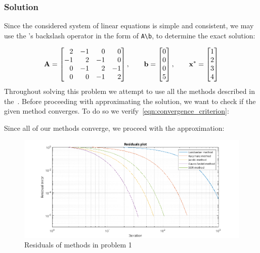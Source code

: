 \subsubsection*{Solution}
Since the considered system of linear equations is simple and consistent, we may use the
\MATLAB's backslash operator in the form of \lstinline[style=Matlab-editor]{A\b}, to
determine the exact solution:

\begin{equation*}
  \mathbf{A} = \begin{bmatrix}
    \phantom{-}2 & -1 & \phantom{-}0 & \phantom{-}0 \\
    -1 & \phantom{-}2 & -1 & \phantom{-}0 \\
    \phantom{-}0 & -1 & \phantom{-}2 & -1 \\
    \phantom{-}0 & \phantom{-}0 & -1 & \phantom{-}2
  \end{bmatrix}, \qquad
  \mathbf{b} = \begin{bmatrix}
    0 \\
    0 \\
    0 \\
    5
  \end{bmatrix}, \qquad
  \mathbf{x}^* = \begin{bmatrix}
    1 \\
    2 \\
    3 \\
    4
  \end{bmatrix}
\end{equation*}
Throughout solving this problem we attempt to use all the methods described in
the~.
Before proceeding with approximating the solution, we want to check if the given method
converges.
To do so we verify~\autoref{eqn:convergence_criterion}:

Since all of our methods converge, we proceed with the approximation:

\begin{figure}[H]
  \centering
  \includegraphics[width=1\textwidth]{images/Residuals_Problem1.png}
  \caption{Residuals of methods in problem 1}
\end{figure}